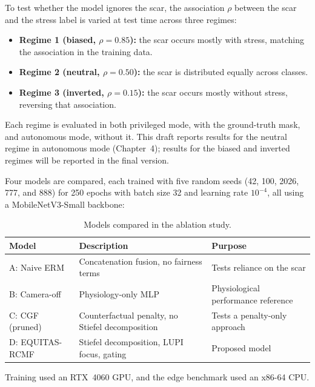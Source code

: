 To test whether the model ignores the scar, the association $\rho$ between the scar and the stress label is varied at test time across three regimes:
\begin{itemize}
    \item \textbf{Regime 1 (biased, $\rho = 0.85$):} the scar occurs mostly with stress, matching the association in the training data.
    \item \textbf{Regime 2 (neutral, $\rho = 0.50$):} the scar is distributed equally across classes.
    \item \textbf{Regime 3 (inverted, $\rho = 0.15$):} the scar occurs mostly without stress, reversing that association.
\end{itemize}
Each regime is evaluated in both privileged mode, with the ground-truth mask, and autonomous mode, without it. This draft reports results for the neutral regime in autonomous mode (Chapter~4); results for the biased and inverted regimes will be reported in the final version.

Four models are compared, each trained with five random seeds (42, 100, 2026, 777, and 888) for 250 epochs with batch size 32 and learning rate $10^{-4}$, all using a MobileNetV3-Small backbone:
\begin{table}[htbp]
\centering
\begin{tabular}{@{}lll@{}}
\toprule
\textbf{Model} & \textbf{Description} & \textbf{Purpose} \\
\midrule
A: Naive ERM & Concatenation fusion, no fairness terms & Tests reliance on the scar \\
B: Camera-off & Physiology-only MLP & Physiological performance reference \\
C: CGF (pruned) & Counterfactual penalty, no Stiefel decomposition & Tests a penalty-only approach \\
D: EQUITAS-RCMF & Stiefel decomposition, LUPI focus, gating & Proposed model \\
\bottomrule
\end{tabular}
\caption{Models compared in the ablation study.}
\label{tab:ablation_models}
\end{table}

Training used an RTX~4060 GPU, and the edge benchmark used an x86-64 CPU.

